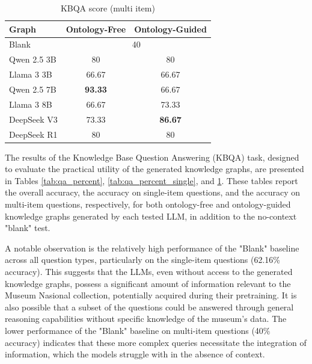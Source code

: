 \documentclass[a4, conference]{IEEEtran}
\begin{document}
\begin{table}[h]
    \centering
    \caption{KBQA score (multi item)}
    \label{tab:qa_percent_multi}
    \begin{tabular}{|l|c|c|}
        \hline
        Graph       & Ontology-Free            & Ontology-Guided \\
        \hline
        Blank       & \multicolumn{2}{|c|}{40}                   \\
        \hline
        Qwen 2.5 3B & 80                       & 80              \\
        \hline
        Llama 3 3B  & 66.67                    & 66.67           \\
        \hline
        Qwen 2.5 7B & \textbf{93.33}           & 66.67           \\
        \hline
        Llama 3 8B  & 66.67                    & 73.33           \\
        \hline
        DeepSeek V3 & 73.33                    & \textbf{86.67}  \\
        \hline
        DeepSeek R1 & 80                       & 80              \\
        \hline
    \end{tabular}
\end{table}

The results of the Knowledge Base Question Answering (KBQA) task, designed to evaluate the practical utility of the generated knowledge graphs, are presented in Tables \ref{tab:qa_percent}, \ref{tab:qa_percent_single}, and \ref{tab:qa_percent_multi}. These tables report the overall accuracy, the accuracy on single-item questions, and the accuracy on multi-item questions, respectively, for both ontology-free and ontology-guided knowledge graphs generated by each tested LLM, in addition to the no-context "blank" test.

A notable observation is the relatively high performance of the "Blank" baseline across all question types, particularly on the single-item questions (62.16\% accuracy). This suggests that the LLMs, even without access to the generated knowledge graphs, possess a significant amount of information relevant to the Museum Nasional collection, potentially acquired during their pretraining. It is also possible that a subset of the questions could be answered through general reasoning capabilities without specific knowledge of the museum's data. The lower performance of the "Blank" baseline on multi-item questions (40\% accuracy) indicates that these more complex queries necessitate the integration of information, which the models struggle with in the absence of context.
\end{document}
